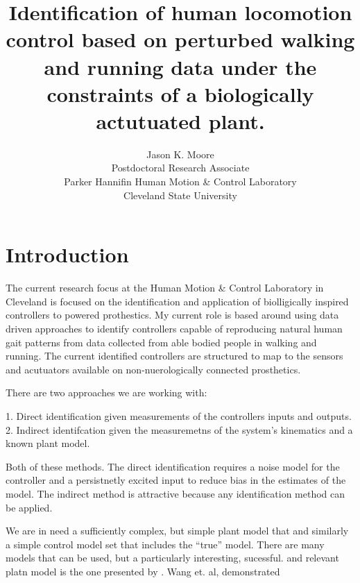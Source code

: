 \documentclass[11pt]{article}
\title{Identification of human locomotion control based on perturbed walking
and running data under the constraints of a biologically actutuated plant.}
\author{Jason K. Moore\\
  Postdoctoral Research Associate\\
  Parker Hannifin Human Motion \& Control Laboratory\\
  Cleveland State University
}
\begin{document}
\maketitle

\section{Introduction}

The current research focus at the Human Motion \& Control Laboratory in
Cleveland is focused on the identification and application of biolligically
inspired controllers to powered prothestics. My current role is based around
using data driven approaches to identify controllers capable of reproducing
natural human gait patterns from data collected from able bodied people in
walking and running. The current identified controllers are structured to map
to the sensors and acutuators available on non-nuerologically connected
prosthetics.

There are two approaches we are working with:

1. Direct identification given measurements of the controllers inputs and
outputs.
2. Indirect identifcation given the measuremetns of the system's kinematics and
a known plant model.

Both of these methods. The direct identification requires a noise model for the
controller and a persistnetly excited input to reduce bias in the estimates of
the model. The indirect method is attractive because any identification method
can be applied.

We are in need a sufficiently complex, but simple plant model that and
similarly a simple control model set that includes the ``true'' model. There
are many models that can be used, but a particularly interesting, sucessful.
and relevant platn model is the one presented by \cite{Wang2012}. Wang et. al,
demonstrated 

%
%
%
%
%
\end{document}
